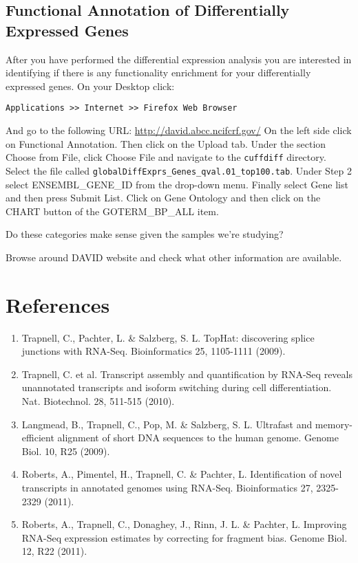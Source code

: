 \begin{bonus}
\section{Functional Annotation of Differentially Expressed Genes}
After you have performed the differential expression analysis you are interested
in identifying if there is any functionality enrichment for your differentially
expressed genes.
On your Desktop click:
\begin{lstlisting}
Applications >> Internet >> Firefox Web Browser
\end{lstlisting}
And go to the following URL: \url{http://david.abcc.ncifcrf.gov/}
On the left side click on Functional Annotation. Then click on the Upload tab.
Under the section Choose from File, click Choose File and navigate to the
\texttt{cuffdiff} directory. Select the file called \texttt{globalDiffExprs\_Genes\_qval.01\_top100.tab}.
Under Step 2 select ENSEMBL\_GENE\_ID from the drop-down menu. Finally select
Gene list and then press Submit List.
Click on Gene Ontology and then click on the CHART button of the GOTERM\_BP\_ALL item.

\begin{questions}
Do these categories make sense given the samples we're studying?
\begin{answer}
\end{answer}

Browse around DAVID website and check what other information are available.
\begin{answer}
\end{answer}
\end{questions}
\end{bonus}

\newpage

\section{References}
\begin{enumerate}
  \item Trapnell, C., Pachter, L. \& Salzberg, S. L. TopHat: discovering splice
  junctions with RNA-Seq. Bioinformatics 25, 1105-1111 (2009).
  \item Trapnell, C. et al. Transcript assembly and quantification by RNA-Seq
  reveals unannotated transcripts and isoform switching during cell
  differentiation. Nat. Biotechnol. 28, 511-515 (2010).
  \item Langmead, B., Trapnell, C., Pop, M. \& Salzberg, S. L. Ultrafast and
  memory-efficient alignment of short DNA sequences to the human genome.
  Genome Biol. 10, R25 (2009).
  \item Roberts, A., Pimentel, H., Trapnell, C. \& Pachter, L. Identification
  of novel transcripts in annotated genomes using RNA-Seq. Bioinformatics 27,
  2325-2329 (2011).
  \item Roberts, A., Trapnell, C., Donaghey, J., Rinn, J. L. \& Pachter, L.
  Improving RNA-Seq expression estimates by correcting for fragment bias.
  Genome Biol. 12, R22 (2011).
\end{enumerate}
